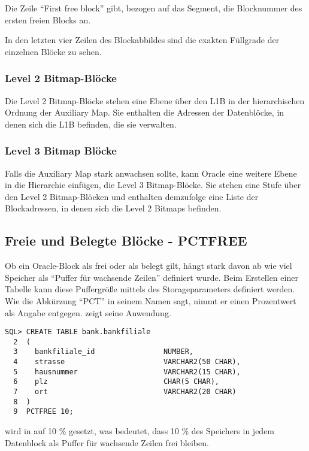           Die Zeile \enquote{First free block} gibt, bezogen auf das Segment, die Blocknummer des ersten freien Blocks an.

          In den letzten vier Zeilen des Blockabbildes sind die exakten F\"ullgrade der einzelnen Bl\"ocke zu sehen.
        \subsubsection{Level 2 Bitmap-Bl\"ocke}
          Die Level 2 Bitmap-Bl\"ocke stehen eine Ebene \"uber den L1B in der hierarchischen Ordnung der Auxiliary Map. Sie enthalten die Adressen der Datenbl\"ocke, in denen sich die L1B befinden, die sie verwalten.
        \subsubsection{Level 3 Bitmap Bl\"ocke}
          Falls die Auxiliary Map stark anwachsen sollte, kann Oracle eine weitere Ebene in die Hierarchie einf\"ugen, die Level 3 Bitmap-Bl\"ocke. Sie stehen eine Stufe \"uber den Level 2 Bitmap-Bl\"ocken und enthalten demzufolge eine Liste der Blockadressen, in denen sich die Level 2 Bitmaps befinden.
      \subsection{Freie und Belegte Bl\"ocke - PCTFREE}
        Ob ein Oracle-Block als frei oder als belegt gilt, h\"angt stark davon ab wie viel Speicher als \enquote{Puffer f\"ur wachsende Zeilen} definiert wurde. Beim Erstellen einer Tabelle kann diese Puffergr\"o\ss{}e mittels des Storageparameters  definiert werden. Wie die Abk\"urzung \enquote{PCT} in seinem Namen sagt, nimmt er einen Prozentwert als Angabe entgegen.  zeigt seine Anwendung.
        \begin{lstlisting}[caption={Der Storageparameter \languageorasql{pctfree}},label=admin102,language=oracle_sql]
SQL> CREATE TABLE bank.bankfiliale
  2  (
  3    bankfiliale_id                NUMBER,
  4    strasse                       VARCHAR2(50 CHAR),
  5    hausnummer                    VARCHAR2(15 CHAR),
  6    plz                           CHAR(5 CHAR),
  7    ort                           VARCHAR2(20 CHAR)
  8  )
  9  PCTFREE 10;
        \end{lstlisting}
         wird in  auf 10 \% gesetzt, was bedeutet, dass 10 \% des Speichers in jedem Datenblock als Puffer f\"ur wachsende Zeilen frei bleiben.
